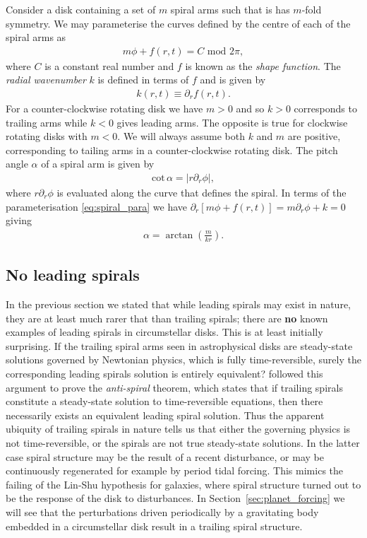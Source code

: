 Consider a disk containing a set of $m$ spiral arms such that is has $m$-fold symmetry. We may parameterise the curves defined by the centre of each of the spiral arms as
\begin{align}
    m\phi + f(r,t) = C \,\, \mathrm{mod} \,\, 2\pi, \label{eq:spiral_para}
\end{align}
where $C$ is a constant real number and $f$ is known as the \textit{shape function}. The \textit{radial wavenumber} $k$ is defined in terms of $f$ and is given by
\begin{align}
    k(r,t) \equiv \partial_r f(r,t).
\end{align}
For a counter-clockwise rotating disk we have $m>0$ and so $k>0$ corresponds to trailing arms while $k<0$ gives leading arms. 
The opposite is true for clockwise rotating disks with $m<0$. 
We will always assume both $k$ and $m$ are positive, corresponding to tailing arms in a counter-clockwise rotating disk. 
The pitch angle $\alpha$ of a spiral arm is given by
\begin{align}
    \mathrm{cot}\,\alpha = \left| r \partial_r \phi \right|,
\end{align}
where $r \partial_r \phi$ is evaluated along the curve that defines the spiral. In terms of the parameterisation \eqref{eq:spiral_para} we have $\partial_r[m\phi+f(r,t)] = m \partial_r \phi + k = 0$ giving
\begin{align}
    \alpha = \arctan \left( \frac{m}{kr} \right). \label{eq:pitchangle}
\end{align}

\subsection{No leading spirals}

In the previous section we stated that while leading spirals may exist in nature, they are at least much rarer that than trailing spirals; there are \textbf{no} known examples of leading spirals in circumstellar disks.
This is at least initially surprising. 
If the trailing spiral arms seen in astrophysical disks are steady-state solutions governed by Newtonian physics, which is fully time-reversible, surely the corresponding leading spirals solution is entirely equivalent?
\citet{lynden-bell1967} followed this argument to prove the \textit{anti-spiral} theorem, which states that if trailing spirals constitute a steady-state solution to time-reversible equations, then there necessarily exists an equivalent leading spiral solution.
Thus the apparent ubiquity of trailing spirals in nature tells us that either the governing physics is not time-reversible, or the spirals are not true steady-state solutions.
In the latter case spiral structure may be the result of a recent disturbance, or may be continuously regenerated for example by period tidal forcing.
This mimics the failing of the Lin-Shu hypothesis for galaxies, where spiral structure turned out to be the response of the disk to disturbances.
In Section~\ref{sec:planet_forcing} we will see that the perturbations driven periodically by a gravitating body embedded in a circumstellar disk result in a trailing spiral structure.

